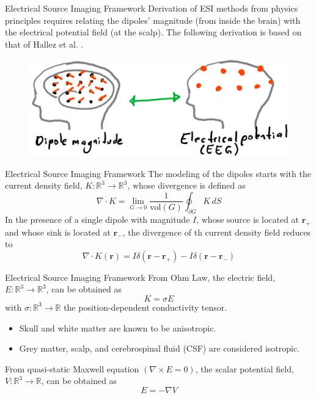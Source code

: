 \documentclass[progressbar=head]{beamer}
\newcommand{\ppar}[1]{ \left( #1 \right) }
\newcommand{\R}{\mathbb{R}}
\newcommand{\rr}{\mathbf{r}}
\begin{document}
\begin{frame}{Electrical Source Imaging Framework}
Derivation of ESI methods from physics principles requires relating the \alert{dipoles' magnitude} (from inside the brain) with the \alert{electrical potential field} (at the scalp).
The following derivation is based on 
that of Hallez et al.
\cite{hallez2007review}.

\begin{figure}
\centering
\includegraphics[width=0.75\linewidth]{./img_oldbeamer/sketch04}
\end{figure}
\end{frame}

\begin{frame}{Electrical Source Imaging Framework}
    The modeling of the dipoles starts with the \alert{current density field}, $K: \R^3 \rightarrow \R^3$, whose divergence is defined as
    \begin{equation}
        \nabla \cdot K = \lim_{G \rightarrow 0} \frac{1}{\text{vol}\ppar{G}}
        \oint_{\partial G} K\, dS
    \end{equation}
    In the presence of a single dipole with magnitude $I$, whose source is located at $\rr_{+}$ and whose sink is located at $\rr_{-}$, the divergence of th current density field reduces to
    \begin{equation}
        \nabla \cdot K(\rr) = I \delta\ppar{\rr-\rr_+} - I \delta\ppar{\rr-\rr_-}
        \label{eq:curr_density}
    \end{equation}
\end{frame}

\begin{frame}{Electrical Source Imaging Framework}
From Ohm Law, the \alert{electric field}, $E: \R^3\rightarrow \R^3$, can be obtained as
\begin{equation}
    K = \sigma E
    \label{eq:elec_field}
\end{equation}
with $\sigma: \R^3 \rightarrow \R$ the position-dependent conductivity tensor.
\begin{itemize}
    \item Skull and white matter are known to be anisotropic.
    \item Grey matter, scalp, and cerebrospinal fluid (CSF) are considered isotropic.
\end{itemize}

From quasi-static Maxwell equation $\ppar{\nabla\times E=0}$, the \alert{scalar potential field}, $V: \R^3\rightarrow \R$, can be obtained as
\begin{equation}
    E = - \nabla V
    \label{eq:pot_field}
\end{equation}
\end{frame}
\end{document}
